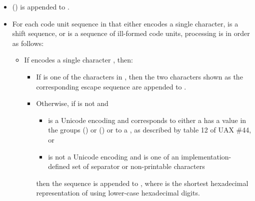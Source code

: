 \documentclass{wg21}
\begin{document}
\begin{itemize}
    \item
     () is appended to .

    \item
    For each code unit sequence  in  that either
    encodes a single character,
    is a shift sequence, or
    is a sequence of ill-formed code units,
    processing is in order as follows:

    \begin{itemize}
        \item
        If  encodes a single character , then:

        \begin{itemize}
            \item
            If  is one of the characters in ,
            then the two characters shown as the corresponding escape sequence
            are appended to .

            \item
            Otherwise, if  is not  and

            \begin{itemize}
                \item
                 is a Unicode encoding and
                 corresponds to either
                a  
                has a value in the groups  () or  () or to
                a  ,
                as described by table 12 of UAX \#44, or

                \item
                 is not a Unicode encoding and
                 is one of an implementation-defined set
                of separator or non-printable characters
            \end{itemize}

            then the sequence 
            is appended to ,
            where 
            is the shortest hexadecimal representation
            of  using lower-case hexadecimal digits.


\end{itemize}
\end{itemize}
\end{itemize}
\end{document}
